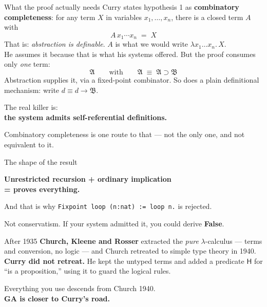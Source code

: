 \documentclass[aspectratio=169,11pt]{beamer}
\newcommand{\key}[1]{{\color{accent}\textbf{#1}}}
\begin{document}
\begin{frame}{What the proof actually needs}
  \vfill
  Curry states hypothesis 1 as \key{combinatory completeness}: for any term $X$
  in variables $x_1,\dots,x_n$, there is a closed term $A$ with
  \[ A\,x_1 \cdots x_n \;=\; X \]
  {\small That is: \emph{abstraction is definable}. $A$ is what we would write
   $\lambda x_1 \dots x_n.\,X$.\\
   He assumes it because that is what his systems offered.}
  \vfill
  \pause
  But the proof consumes only \emph{one} term:
  \[ \mathfrak{A} \qquad\text{with}\qquad
     \mathfrak{A} \;\equiv\; \mathfrak{A} \supset \mathfrak{B} \]
  {\small Abstraction supplies it, via a fixed-point combinator.
   So does a plain definitional mechanism: write $d \equiv d \to \mathfrak{B}$.}
  \vfill
  \pause
  \begin{center}\Large
    The real killer is:\\
    \key{the system admits self-referential definitions.}
  \end{center}
  \vfill
  \begin{center}\small
    Combinatory completeness is one route to that --- not the only one,
    and not equivalent to it.
  \end{center}
\end{frame}

\begin{frame}{The shape of the result}
  \vfill
  \begin{center}\Large
    \key{Unrestricted recursion + ordinary implication\\[0.3em] = proves everything.}
  \end{center}
  \vfill
  \pause
  \begin{center}
    And that is why \texttt{Fixpoint loop (n:nat) := loop n.} is rejected.
  \end{center}
  \vfill
  \pause
  \begin{center}\small
    Not conservatism. If your system admitted it, you could derive \key{False}.
  \end{center}
  \vfill
\end{frame}

\begin{frame}{After 1935}
  \vfill
  \key{Church, Kleene and Rosser} extracted the \emph{pure} $\lambda$-calculus ---
  terms and conversion, no logic --- and Church retreated to simple type theory
  in 1940.
  \vfill
  \key{Curry did not retreat.} He kept the untyped terms and added a predicate
  $\mathsf{H}$ for ``is a proposition,'' using it to guard the logical rules.
  \vfill
  \pause
  \begin{center}
    Everything you use descends from Church 1940.\\[0.4em]
    \key{GA is closer to Curry's road.}
  \end{center}
  \vfill
\end{frame}
\end{document}
